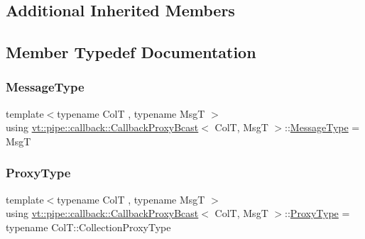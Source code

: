 \subsection*{Additional Inherited Members}


\subsection{Member Typedef Documentation}
\mbox{\label{structvt_1_1pipe_1_1callback_1_1_callback_proxy_bcast_ad65703bd011d36432495be4451ea61e7}} 
\subsubsection{\texorpdfstring{Message\+Type}{MessageType}}
{\footnotesize\ttfamily template$<$typename ColT , typename MsgT $>$ \\
using \hyperlink{structvt_1_1pipe_1_1callback_1_1_callback_proxy_bcast}{vt\+::pipe\+::callback\+::\+Callback\+Proxy\+Bcast}$<$ ColT, MsgT $>$\+::\hyperlink{structvt_1_1pipe_1_1callback_1_1_callback_proxy_bcast_ad65703bd011d36432495be4451ea61e7}{Message\+Type} =  MsgT}

\mbox{\label{structvt_1_1pipe_1_1callback_1_1_callback_proxy_bcast_a27c62cb9cbd1dcd3f135dcd98d98c991}} 
\subsubsection{\texorpdfstring{Proxy\+Type}{ProxyType}}
{\footnotesize\ttfamily template$<$typename ColT , typename MsgT $>$ \\
using \hyperlink{structvt_1_1pipe_1_1callback_1_1_callback_proxy_bcast}{vt\+::pipe\+::callback\+::\+Callback\+Proxy\+Bcast}$<$ ColT, MsgT $>$\+::\hyperlink{structvt_1_1pipe_1_1callback_1_1_callback_proxy_bcast_a27c62cb9cbd1dcd3f135dcd98d98c991}{Proxy\+Type} =  typename Col\+T\+::\+Collection\+Proxy\+Type}


